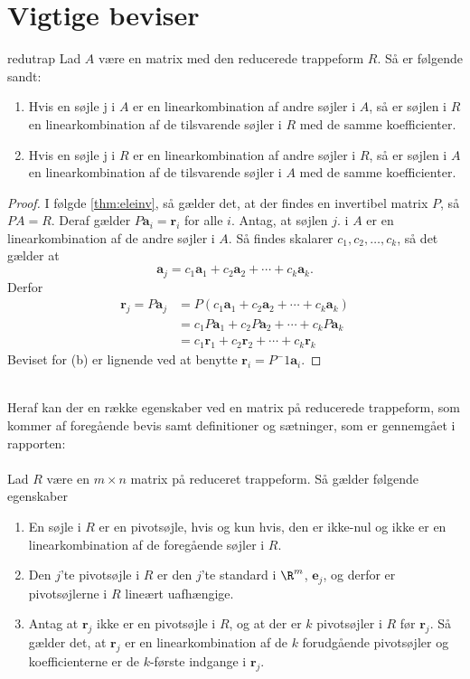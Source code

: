 \chapter{Vigtige beviser}

\begin{thm}{}{redutrap}
Lad $A$ være en matrix med den reducerede trappeform $R$. Så er følgende sandt:
\begin{enumerate}[label=(\alph*)]
\item  Hvis en søjle j i $A$ er en linearkombination  af andre søjler i $A$, så er søjlen i $R$ en linearkombination af de tilsvarende søjler i $R$ med de samme koefficienter.
\item  Hvis en søjle j i $R$ er en linearkombination  af andre søjler i $R$, så er søjlen i $A$ en linearkombination af de tilsvarende søjler i $A$ med de samme koefficienter.
\end{enumerate}
\end{thm}%
\begin{proof}
I følgde \ref{thm:eleinv}, så gælder det, at der findes en invertibel matrix $P$, så $PA=R$. Deraf gælder $P\textbf{a}_i=\textbf{r}_i$ for alle $i$. Antag, at søjlen $j$. i $A$ er en linearkombination af de andre søjler i $A$. Så findes skalarer $c_1,c_2,\ldots,c_k$, så det gælder at \\
\begin{equation}
\textbf{a}_j=c_1\textbf{a}_1+c_2\textbf{a}_2+\cdots+c_k\textbf{a}_k.
\end{equation}
Derfor 
\begin{align*}
\textbf{r}_j=P\textbf{a}_j&=P(c_1\textbf{a}_1+c_2\textbf{a}_2+\cdots+c_k\textbf{a}_k) \\
&= c_1P\textbf{a}_1+c_2P\textbf{a}_2+\cdots+c_kP\textbf{a}_k\\
&= c_1\textbf{r}_1+c_2\textbf{r}_2+\cdots+c_k\textbf{r}_k
\end{align*}
Beviset for (b) er lignende ved at benytte $\textbf{r}_i=P^-1\textbf{a}_i.$
\end{proof} \\
%
Heraf kan der en række egenskaber ved en matrix på reducerede trappeform, som kommer af foregående bevis samt definitioner og sætninger, som er gennemgået i rapporten: \\\\
%
Lad $R$ være en $m \times n$ matrix på reduceret trappeform. Så gælder følgende egenskaber
\begin{enumerate}[label=(\alph*)]
\item En søjle i $R$ er en pivotsøjle, hvis og kun hvis, den er ikke-nul og ikke er en linearkombination af de foregående søjler i $R$. 
\item Den $j$'te pivotsøjle i $R$ er den $j$'te standard i $\R^m$, $\textbf{e}_j$, og derfor er pivotsøjlerne i $R$ lineært uafhængige. 
\item Antag at $\textbf{r}_j$ ikke er en pivotsøjle i $R$, og at der er $k$ pivotsøjler i $R$ før $\textbf{r}_j$. Så gælder det, at $\textbf{r}_j$ er en linearkombination af de $k$ forudgående pivotsøjler og koefficienterne er de $k$-første indgange i $\textbf{r}_j$. 
\end{enumerate}

